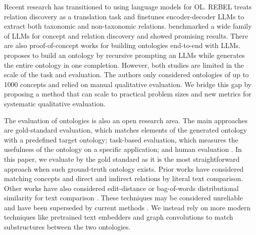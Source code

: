 \documentclass{article}
\begin{document}
Recent research has transitioned to using language models for OL. REBEL \cite{cabot2021rebel} treats relation discovery as a translation task and finetunes encoder-decoder LLMs to extract both taxonomic and non-taxonomic relations. \citet{babaei2023llms4ol} benchmarked a wide family of LLMs for concept and relation discovery and showed promising results. There are also proof-of-concept works for building ontologies end-to-end with LLMs. \citet{funk2023towards} proposes to build an ontology by recursive prompting an LLMs while \citet{trajanoska2023enhancing} generates the entire ontology in one completion. However, both studies are limited in the scale of the task and evaluation. The authors only considered ontologies of up to 1000 concepts and relied on manual qualitative evaluation. We bridge this gap by proposing a method that can scale to practical problem sizes and new metrics for systematic qualitative evaluation.

The evaluation of ontologies is also an open research area. The main approaches are gold-standard evaluation, which matches elements of the generated ontology with a predefined target ontology; task-based evaluation, which measures the usefulness of the ontology on a specific application; and human evaluation \cite{raad2015survey,brank2005survey}. In this paper, we evaluate by the gold standard as it is the most straightforward approach when such ground-truth ontology exists. Prior works have considered matching concepts \cite{maedche2002measuring} and direct and indirect relations \cite{Kashyap2005TaxaMinerAE, Treeratpituk2013GraphbasedAT} by literal text comparison. Other works have also considered edit-distance \cite{Ehrig2005SimilarityFO} or bag-of-words distributional similarity for text comparison \cite{Zavitsanos2011GoldSE}.  These techniques may be considered unreliable and have been superseded by current methods \cite{conneau2017supervised}. We instead rely on more modern techniques like pretrained text embedders \cite{devlin2018bert} and graph convolutions \cite{kipf2016semi} to match substructures between the two ontologies. 
\end{document}
